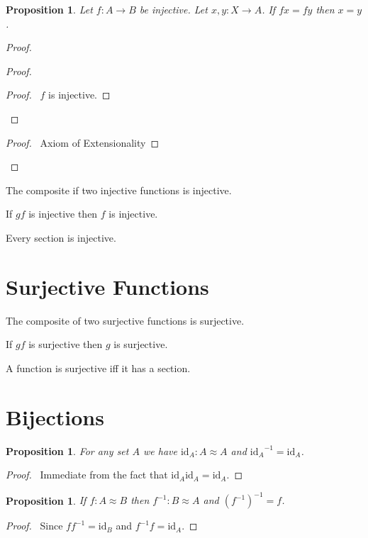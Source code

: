 \documentclass{book}
\let\qed\relax
\newtheorem{prop}[ax]{Proposition}
\theoremstyle{definition}
\newcommand{\id}[1]{\ensuremath{\mathrm{id}_{#1}}}
\newcommand{\inv}[1]{\ensuremath{{#1}^{-1}}}
\begin{document}
\begin{prop}
Let $f : A \rightarrow B$ be injective. Let $x,y : X \rightarrow A$. If $fx = fy$ then $x = y$.
\end{prop}

\begin{proof}
\pf
{}
\begin{proof}
	\begin{proof}
		\pf\ $f$ is injective.
	\end{proof}
\end{proof}
\begin{proof}
	\pf\ Axiom of Extensionality
\end{proof}
\qed
\end{proof}

The composite if two injective functions is injective.

If $gf$ is injective then $f$ is injective.

Every section is injective.

\section{Surjective Functions}

The composite of two surjective functions is surjective.

If $gf$ is surjective then $g$ is surjective.

A function is surjective iff it has a section.

\section{Bijections}

\begin{prop}
For any set $A$ we have $\id{A} : A \approx A$ and $\inv{\id{A}} = \id{A}$.
\end{prop}

\begin{proof}
\pf\ Immediate from the fact that $\id{A} \id{A} = \id{A}$. \qed
\end{proof}

\begin{prop}
If $f : A \approx B$ then $\inv{f} : B \approx A$ and $\inv{(\inv{f})} = f$.
\end{prop}

\begin{proof}
\pf\ Since $f \inv{f} = \id{B}$ and $\inv{f} f = \id{A}$. \qed
\end{proof}
\end{document}
